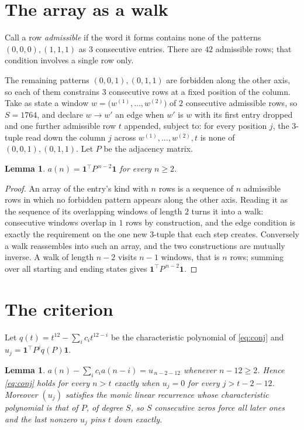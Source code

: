 \documentclass[11pt,a4paper]{article}
\theoremstyle{plain}
\newtheorem{lemma}[theorem]{Lemma}
\theoremstyle{definition}
\begin{document}
\section{The array as a walk}

Call a row \emph{admissible} if the word it forms contains none of the patterns
$(0,0,0), (1,1,1)$ as $3$ consecutive entries. There are $42$ admissible rows; that condition
involves a single row only.

The remaining patterns $(0,0,1), (0,1,1)$ are forbidden along the other axis, so each of them
constrains $3$ consecutive rows at a fixed position of the column. Take as state a
window $w=\bigl(w^{(1)},\dots,w^{(2)}\bigr)$ of $2$ consecutive admissible
rows, so $S=1764$, and declare $w\to w'$ an edge when $w'$ is $w$ with its first entry
dropped and one further admissible row $t$ appended, subject to: for every position
$j$, the $3$-tuple read down the column $j$ across $w^{(1)},\dots,w^{(2)},t$
is none of $(0,0,1), (0,1,1)$. Let $P$ be the adjacency matrix.

\begin{lemma}\label{lem:walk}
$a(n)=\mathbf{1}^{\!\top}P^{\,n-2}\mathbf{1}$ for every $n\ge2$.
\end{lemma}

\begin{proof}
An array of the entry's kind with $n$ rows is a sequence of $n$ admissible rows in
which no forbidden pattern appears along the other axis. Reading it as the sequence of its
overlapping windows of length $2$ turns it into a walk: consecutive windows overlap in
$1$ rows by construction, and the edge condition is exactly the requirement on the one
new $3$-tuple that each step creates. Conversely a walk reassembles into such an array,
and the two constructions are mutually inverse. A walk of length $n-2$ visits $n-1$
windows, that is $n$ rows; summing over all starting and ending states gives
$\mathbf{1}^{\!\top}P^{\,n-2}\mathbf{1}$.
\end{proof}

\section{The criterion}

Let $q(t)=t^{12}-\sum_i c_i t^{12-i}$ be the characteristic polynomial of
\eqref{eq:conj} and $u_j=\mathbf{1}^{\!\top}P^{j}q(P)\mathbf{1}$.

\begin{lemma}\label{lem:crit}
$a(n)-\sum_i c_i a(n-i)=u_{\,n-2-12}$ whenever $n-12\ge2$. Hence
\eqref{eq:conj} holds for every $n>t$ exactly when $u_j=0$ for every
$j>t-2-12$. Moreover $(u_j)$ satisfies the monic linear recurrence whose
characteristic polynomial is that of $P$, of degree $S$, so $S$ consecutive zeros force all
later ones and the last nonzero $u_j$ pins $t$ down exactly.
\end{lemma}
\end{document}
